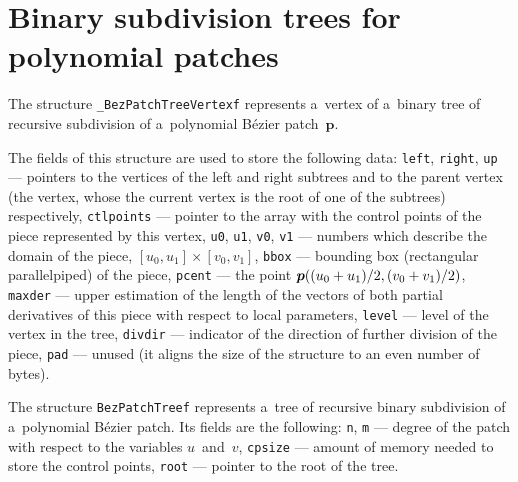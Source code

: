 \section{Binary subdivision trees for polynomial patches}

\hspace*{\parindent}The structure \texttt{\_BezPatchTreeVertexf} represents
a~vertex of a~binary tree of recursive subdivision of a~polynomial
B\'{e}zier patch~$\bm{p}$.

The fields of this structure are used to store the following data:
\texttt{left}, \texttt{right}, \texttt{up} --- pointers to the vertices of
the left and right subtrees and to the parent vertex (the vertex,
whose the current vertex is the root of one of the subtrees) respectively,
\texttt{ctlpoints} --- pointer to the array with the control points
of the piece represented by this vertex,
\texttt{u0}, \texttt{u1}, \texttt{v0}, \texttt{v1}
--- numbers which describe the domain of the piece, $[u_0,u_1]\times[v_0,v_1]$,
\texttt{bbox} --- bounding box (rectangular parallelpiped) of the piece,
\texttt{pcent} --- the point
$\bm{p}((u_0\nolinebreak +\nolinebreak u_1)/2,
(v_0\nolinebreak +\nolinebreak v_1)/2)$, \texttt{maxder}
--- upper estimation of the length of the vectors of both partial derivatives
of this piece with respect to local parameters, \texttt{level} --- level of
the vertex in the tree, \texttt{divdir} --- indicator of the direction
of further division of the piece, \texttt{pad} --- unused (it aligns the
size of the structure to an even number of bytes).

\vspace{\bigskipamount}
The structure \texttt{BezPatchTreef} represents a~tree of recursive binary
subdivision of a~polynomial B\'{e}zier patch. Its fields are the following:
\texttt{n}, \texttt{m} --- degree of the patch with respect to the
variables $u$~and~$v$, \texttt{cpsize} --- amount of memory needed to store
the control points, \texttt{root} --- pointer to the root of the tree.

